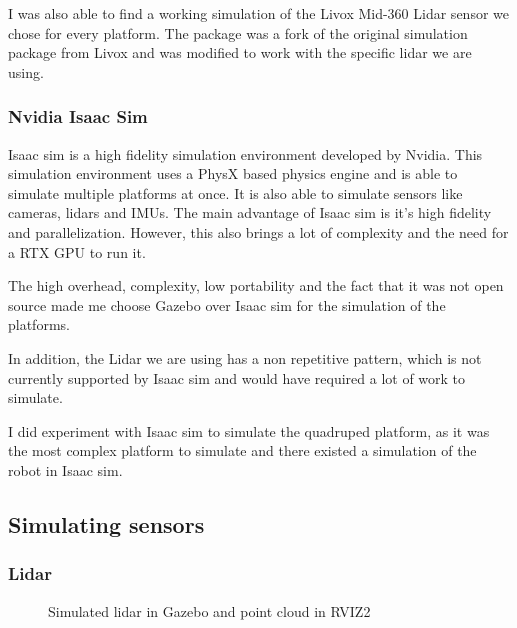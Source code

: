 \documentclass[11pt]{article}
\begin{document}
                I was also able to find a working simulation of the Livox Mid-360 Lidar sensor we chose for every platform. The package \cite{livox_lidar_simulation_fork} was a fork of the original simulation package from Livox \cite{livox_laser_simulation} and was modified to work with the specific lidar we are using. 
            \subsubsection{Nvidia Isaac Sim}

                Isaac sim is a high fidelity simulation environment developed by Nvidia. This simulation environment uses a PhysX based physics engine and is able to simulate multiple platforms at once. It is also able to simulate sensors like cameras, lidars and IMUs. The main advantage of Isaac sim is it's high fidelity and parallelization. However, this also brings a lot of complexity and the need for a RTX GPU to run it.

                The high overhead, complexity, low portability and the fact that it was not open source made me choose Gazebo over Isaac sim for the simulation of the platforms.

                In addition, the Lidar we are using has a non repetitive pattern, which is not currently supported by Isaac sim and would have required a lot of work to simulate.

                I did experiment with Isaac sim to simulate the quadruped platform, as it was the most complex platform to simulate and there existed a simulation of the robot in Isaac sim.
        \subsection{Simulating sensors}
            \subsubsection{Lidar}

            \begin{figure}[H]
                \centering
                \caption{Simulated lidar in Gazebo and point cloud in RVIZ2}
            \end{figure}
\end{document}
